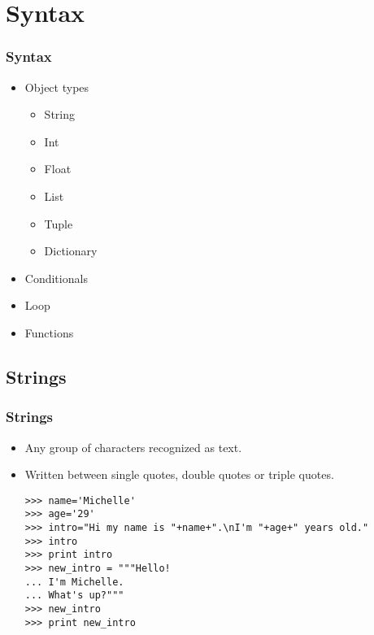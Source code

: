 \documentclass[xcolor=x11names,compress]{beamer}
\renewcommand{\(}{\begin{columns}}
\renewcommand{\)}{\end{columns}}
\newcommand{\<}[1]{\begin{column}{#1}}
\renewcommand{\>}{\end{column}}
\begin{document}
\section{Syntax}
\begin{frame}
\frametitle{Syntax}
\begin{itemize}
\item Object types
\begin{itemize}
\item String
\item Int
\item Float
\item List
\item Tuple
\item Dictionary
\end{itemize}
\item Conditionals
\item Loop
\item Functions
\end{itemize}
\end{frame}

\subsection{Strings}
\begin{frame}[fragile]
\frametitle{Strings}
\begin{itemize}
\item Any group of characters recognized as text. \pause
\item Written between single quotes, double quotes or triple quotes. \pause
\scriptsize
\begin{verbatim}
>>> name='Michelle'
>>> age='29'
>>> intro="Hi my name is "+name+".\nI'm "+age+" years old."
>>> intro
>>> print intro
>>> new_intro = """Hello!
... I'm Michelle.
... What's up?"""
>>> new_intro
>>> print new_intro
\end{verbatim}
\end{itemize}
\end{frame}
\end{document}
